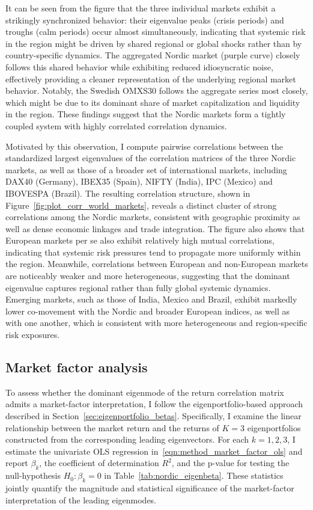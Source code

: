 \documentclass[pdflatex,sn-basic]{sn-jnl}%
\theoremstyle{thmstyleone}%
\theoremstyle{thmstyletwo}%
\theoremstyle{thmstylethree}%
\begin{document}
It can be seen from the figure that the three individual markets exhibit a strikingly synchronized behavior: their eigenvalue peaks (crisis periods) and troughs (calm periods) occur almost simultaneously, indicating that systemic risk in the region might be driven by shared regional or global shocks rather than by country-specific dynamics. The aggregated Nordic market (purple curve) closely follows this shared behavior while exhibiting reduced idiosyncratic noise, effectively providing a cleaner representation of the underlying regional market behavior. Notably, the Swedish OMXS30 follows the aggregate series most closely, which might be due to its dominant share of market capitalization and liquidity in the region. These findings suggest that the Nordic markets form a tightly coupled system with highly correlated correlation dynamics. 

Motivated by this observation, I compute pairwise correlations between the standardized largest eigenvalues of the correlation matrices of the three Nordic markets, as well as those of a broader set of international markets, including DAX40 (Germany), IBEX35 (Spain), NIFTY (India), IPC (Mexico) and IBOVESPA (Brazil). The resulting correlation structure, shown in Figure~\ref{fig:plot_corr_world_markets}, reveals a distinct cluster of strong correlations among the Nordic markets, consistent with geographic proximity as well as dense economic linkages and trade integration. The figure also shows that European markets per se also exhibit relatively high mutual correlations, indicating that systemic risk pressures tend to propagate more uniformly within the region. Meanwhile, correlations between European and non-European markets are noticeably weaker and more heterogeneous, suggesting that the dominant eigenvalue captures regional rather than fully global systemic dynamics. Emerging markets, such as those of India, Mexico and Brazil, exhibit markedly lower co-movement with the Nordic and broader European indices, as well as with one another, which is consistent with more heterogeneous and region-specific risk exposures.

\subsection{Market factor analysis}
To assess whether the dominant eigenmode of the return correlation matrix admits a market-factor interpretation, I follow the eigenportfolio-based approach described in Section~\ref{sec:eigenportfolio_betas}. Specifically, I examine the linear relationship between the market return and the returns of $K=3$ eigenportfolios constructed from the corresponding leading eigenvectors. For each $k=1,2,3$, I estimate the univariate OLS regression in~\eqref{eqn:method_market_factor_ols} and report $\beta_k$, the coefficient of determination $R^2$, and the p-value for testing the null-hypothesis $H_0:\beta_k=0$ in Table~\ref{tab:nordic_eigenbeta}. These statistics jointly quantify the magnitude and statistical significance of the market-factor interpretation of the leading eigenmodes.
\end{document}
